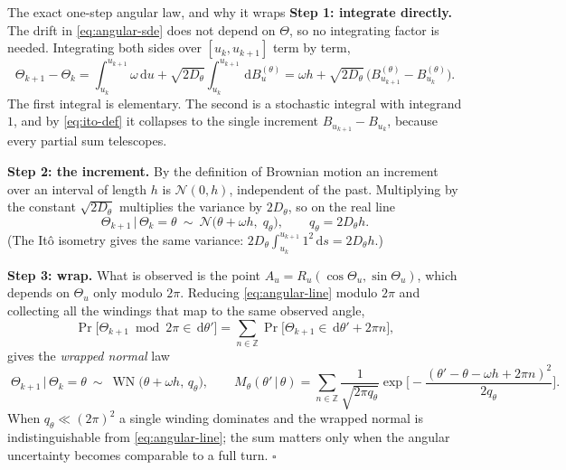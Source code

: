 \documentclass[11pt,a4paper]{article}
\newcommand{\N}{\mathcal{N}}
\newcommand{\given}{\,\vert\,}
\newcommand{\dd}{\,\mathrm d}
\newcommand{\WN}{\operatorname{WN}}
\newcounter{toolbox}
\begin{document}
\begin{toolbox}{The exact one-step angular law, and why it wraps}\label{tb:angular}
\textbf{Step 1: integrate directly.} The drift in \eqref{eq:angular-sde} does not depend on
$\Theta$, so no integrating factor is needed. Integrating both sides over
$[u_k,u_{k+1}]$ term by term,
\begin{equation}
 \Theta_{k+1}-\Theta_k
 =\int_{u_k}^{u_{k+1}}\!\!\omega\dd u
 +\sqrt{2D_\theta}\int_{u_k}^{u_{k+1}}\!\!\dd B_u^{(\theta)}
 =\omega h+\sqrt{2D_\theta}\,\big(B^{(\theta)}_{u_{k+1}}-B^{(\theta)}_{u_k}\big).
 \label{eq:angular-integrated}
\end{equation}
The first integral is elementary. The second is a stochastic integral with integrand $1$, and
by \eqref{eq:ito-def} it collapses to the single increment
$B_{u_{k+1}}-B_{u_k}$, because every partial sum telescopes.

\textbf{Step 2: the increment.} By the definition of Brownian motion an increment over an
interval of length $h$ is $\N(0,h)$, independent of the past. Multiplying by the constant
$\sqrt{2D_\theta}$ multiplies the variance by $2D_\theta$, so on the real line
\begin{equation}
 \Theta_{k+1}\given\Theta_k=\theta\ \sim\ \N\big(\theta+\omega h,\;q_\theta\big),
 \qquad q_\theta=2D_\theta h .
 \label{eq:angular-line}
\end{equation}
(The It\^o isometry gives the same variance: $2D_\theta\int_{u_k}^{u_{k+1}}1^2\dd s=2D_\theta h$.)

\textbf{Step 3: wrap.} What is observed is the point $A_u=R_u(\cos\Theta_u,\sin\Theta_u)$,
which depends on $\Theta_u$ only modulo $2\pi$. Reducing \eqref{eq:angular-line} modulo $2\pi$
and collecting all the windings that map to the same observed angle,
\[
 \Pr\big[\Theta_{k+1}\bmod2\pi\in\dd\theta'\big]
 =\sum_{n\in\mathbb Z}\Pr\big[\Theta_{k+1}\in\dd\theta'+2\pi n\big],
\]
gives the \emph{wrapped normal} law
\begin{equation}
 \boxed{\;\Theta_{k+1}\given\Theta_k=\theta\ \sim\ \WN\big(\theta+\omega h,\,q_\theta\big),}
 \qquad
 M_\theta(\theta'\given\theta)
 =\sum_{n\in\mathbb Z}\frac{1}{\sqrt{2\pi q_\theta}}
 \exp\Big[-\frac{(\theta'-\theta-\omega h+2\pi n)^2}{2q_\theta}\Big].
 \label{eq:angular-transition}
\end{equation}
When $q_\theta\ll(2\pi)^2$ a single winding dominates and the wrapped normal is
indistinguishable from \eqref{eq:angular-line}; the sum matters only when the angular
uncertainty becomes comparable to a full turn. \hfill$\square$
\end{toolbox}
\end{document}
